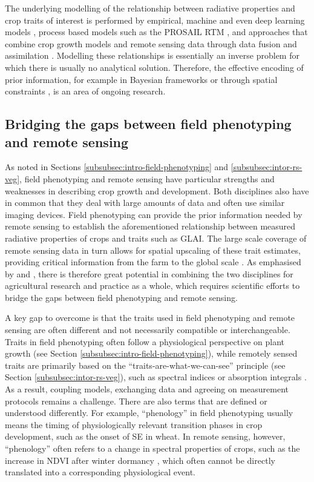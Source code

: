 The underlying modelling of the relationship between radiative properties and crop traits of interest is performed by empirical, machine and even deep learning models \citep{verrelst_quantifying_2019}, process based models such as the PROSAIL \gls{RTM} \citep{jacquemoud_prospectsail_2009}, and approaches that combine crop growth models and remote sensing data through data fusion and assimilation \citep{ma_wheat_2022}. Modelling these relationships is essentially an inverse problem for which there is usually no analytical solution. Therefore, the effective encoding of prior information, for example in Bayesian frameworks \citep{zhang_towards_2023} or through spatial constraints \citep{atzberger_spatially_2012}, is an area of ongoing research.

\subsection{Bridging the gaps between field phenotyping and remote sensing}
As noted in Sections \ref{subsubsec:intro-field-phenotyping} and \ref{subsubsec:intor-rs-veg}, field phenotyping and remote sensing have particular strengths and weaknesses in describing crop growth and development. Both disciplines also have in common that they deal with large amounts of data and often use similar imaging devices. Field phenotyping can provide the prior information needed by remote sensing to establish the aforementioned relationship between measured radiative properties of crops and traits such as \gls{GLAI}. The large scale coverage of remote sensing data in turn allows for spatial upscaling of these trait estimates, providing critical information from the farm to the global scale \citep{weiss_remote_2020}. As emphasised by \cite{machwitz_bridging_2021} and \cite{walter_advances_2022}, there is therefore great potential in combining the two disciplines for agricultural research and practice as a whole, which requires scientific efforts to bridge the gaps between field phenotyping and remote sensing.

A key gap to overcome is that the traits used in field phenotyping and remote sensing are often different and not necessarily compatible or interchangeable. Traits in field phenotyping often follow a physiological perspective on plant growth (see Section \ref{subsubsec:intro-field-phenotyping}), while remotely sensed traits are primarily based on the ``traits-are-what-we-can-see'' principle (see Section \ref{subsubsec:intor-rs-veg}), such as spectral indices \cite{bannari_review_1995} or absorption integrals \citep[for example]{wocher_rtm-based_2020}. As a result, coupling models, exchanging data and agreeing on measurement protocols remains a challenge. There are also terms that are defined or understood differently. For example, ``phenology'' in field phenotyping usually means the timing of physiologically relevant transition phases in crop development, such as the onset of \gls{SE} in wheat. In remote sensing, however, ``phenology'' often refers to a change in spectral properties of crops, such as the increase in \gls{NDVI} after winter dormancy \citep{de_beurs_land_2004}, which often cannot be directly translated into a corresponding physiological event.

